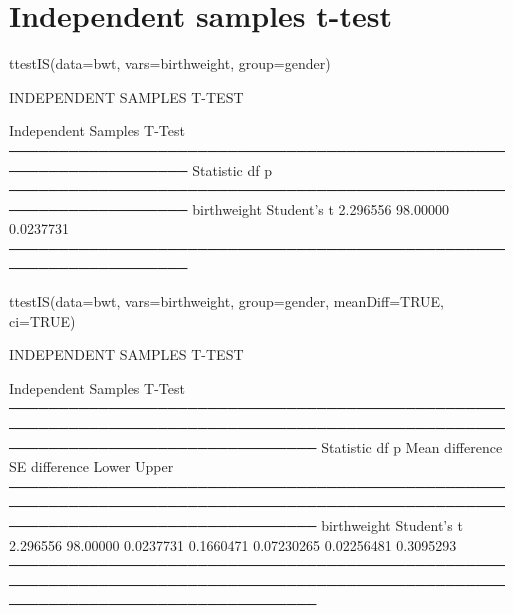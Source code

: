 \documentclass[
]{memoir}
\newenvironment{Shaded}{\begin{snugshade}}{\end{snugshade}}
\newcommand{\AttributeTok}[1]{\textcolor[rgb]{0.77,0.63,0.00}{#1}}
\newcommand{\ConstantTok}[1]{\textcolor[rgb]{0.00,0.00,0.00}{#1}}
\newcommand{\FunctionTok}[1]{\textcolor[rgb]{0.00,0.00,0.00}{#1}}
\newcommand{\NormalTok}[1]{#1}
\begin{document}
\hypertarget{independent-samples-t-test}{%
\section{Independent samples t-test}\label{independent-samples-t-test}}

\begin{Shaded}
\begin{Highlighting}[]
\FunctionTok{ttestIS}\NormalTok{(}\AttributeTok{data=}\NormalTok{bwt, }\AttributeTok{vars=}\NormalTok{birthweight, }\AttributeTok{group=}\NormalTok{gender)}
\end{Highlighting}
\end{Shaded}

INDEPENDENT SAMPLES T-TEST

Independent Samples T-Test\\
────────────────────────────────────────────────────────────────────
Statistic df p\\
────────────────────────────────────────────────────────────────────
birthweight Student's t 2.296556 98.00000 0.0237731\\
────────────────────────────────────────────────────────────────────

\begin{Shaded}
\begin{Highlighting}[]
\FunctionTok{ttestIS}\NormalTok{(}\AttributeTok{data=}\NormalTok{bwt, }\AttributeTok{vars=}\NormalTok{birthweight, }\AttributeTok{group=}\NormalTok{gender, }\AttributeTok{meanDiff=}\ConstantTok{TRUE}\NormalTok{, }\AttributeTok{ci=}\ConstantTok{TRUE}\NormalTok{)}
\end{Highlighting}
\end{Shaded}

INDEPENDENT SAMPLES T-TEST

Independent Samples T-Test\\
───────────────────────────────────────────────────────────────────────────────────────────────────────────────────────────────────
Statistic df p Mean difference SE difference Lower Upper\\
───────────────────────────────────────────────────────────────────────────────────────────────────────────────────────────────────
birthweight Student's t 2.296556 98.00000 0.0237731 0.1660471 0.07230265 0.02256481 0.3095293\\
───────────────────────────────────────────────────────────────────────────────────────────────────────────────────────────────────
\end{document}
